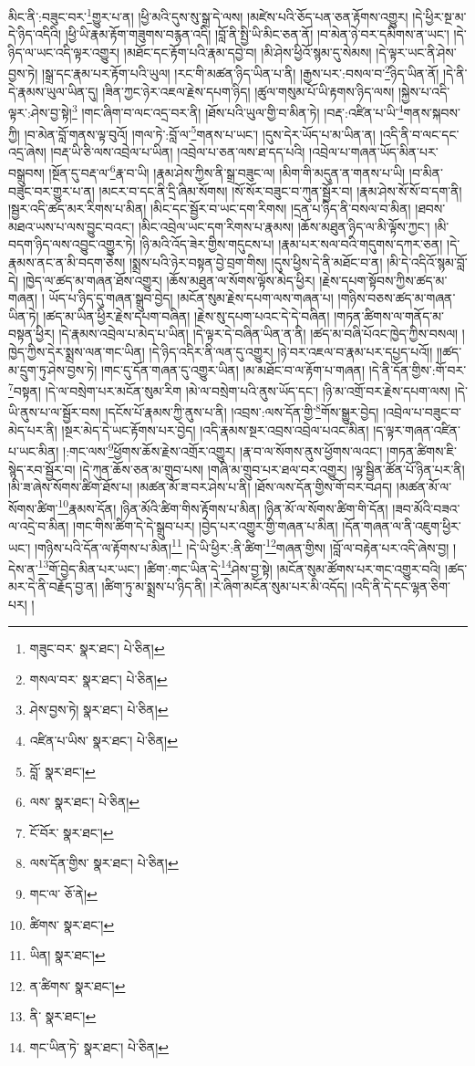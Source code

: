 མིང་ནི་:བཟུང་བར་\footnote{གཟུང་བར་  སྣར་ཐང་།  པེ་ཅིན། }གྱུར་པ་ན། །ཕྱི་མའི་དུས་སུ་སྒྲ་དེ་ལས། །མཛེས་པའི་ཅོད་པན་ཅན་རྟོགས་འགྱུར། །དེ་ཕྱིར་སྔ་མ་དེ་ཉིད་འདིའི། །ཕྱི་ཡི་རྣམ་རྟོག་གཟུགས་བརྙན་འདི། །བློ་ནི་སྤྱི་ཡི་མིང་ཅན་ནོ། །བ་མེན་ཉེ་བར་དམིགས་ན་ཡང་། །དེ་ཉིད་ལ་ཡང་འདི་ལྟར་འགྱུར། །མཐོང་དང་རྟོག་པའི་རྣམ་དབྱེ་བ། །མི་ཤེས་ཕྱིའོ་སྙམ་དུ་སེམས། །དེ་ལྟར་ཡང་ནི་ཤེས་བྱས་ཏེ། །སྒྲ་དང་རྣམ་པར་རྟོག་པའི་ཡུལ། །རང་གི་མཚན་ཉིད་ཡིན་པ་ནི། །རྒྱས་པར་:བསལ་བ་\footnote{གསལ་བར་  སྣར་ཐང་།  པེ་ཅིན། }ཉིད་ཡིན་ནོ། །དེ་ནི་དེ་རྣམས་ཡུལ་ཡིན་དུ། །ཟིན་ཀྱང་ཉེར་འཇལ་རྗེས་དཔག་ཉིད། །ཚུལ་གསུམ་པོ་ཡི་རྟགས་ཉིད་ལས། །སྐྱེས་པ་འདི་ལྟར་:ཤེས་བྱ་སྟེ།\footnote{ཤེས་བྱས་ཏེ།  སྣར་ཐང་།  པེ་ཅིན། } །གང་ཞིག་བ་ལང་འདྲ་བར་ནི། །ཐོས་པའི་ཡུལ་གྱི་བ་མིན་ཏེ། །བརྡ་:འཛིན་པ་ཡི་\footnote{འཛིན་པ་ཡིས་  སྣར་ཐང་།  པེ་ཅིན། }གནས་སྐབས་ཀྱི། །བ་མེན་བློ་གནས་ལྟ་བུའོ། །གལ་ཏེ་:བློ་ལ་\footnote{བློ་  སྣར་ཐང་། }གནས་པ་ཡང་། །དུས་དེར་ཡོད་པ་མ་ཡིན་ན། །འདི་ནི་བ་ལང་དང་འདྲ་ཞེས། །བརྡ་ཡི་ཅི་ལས་འབྲེལ་པ་ཡིན། །འབྲེལ་པ་ཅན་ལས་ཐ་དད་པའི། །འབྲེལ་པ་གཞན་ཡོད་མིན་པར་བསྒྲུབས། །སྔོན་དུ་བརྡ་ལ་\footnote{ལས་  སྣར་ཐང་།  པེ་ཅིན། }རྣ་བ་ཡི། །རྣམ་ཤེས་ཀྱིས་ནི་སྒྲ་བཟུང་ལ། །མིག་གི་མདུན་ན་གནས་པ་ཡི། །བ་མིན་བཟུང་བར་གྱུར་པ་ན། །མངར་བ་དང་ནི་དྲི་ཞིམ་སོགས། །སོ་སོར་བཟུང་བ་ཀུན་སྦྱོར་བ། །རྣམ་ཤེས་སོ་སོ་བ་དག་ནི། །སྦྱར་འདི་ཚད་མར་རིགས་པ་མིན། །མིང་དང་སྦྱོར་བ་ཡང་དག་རིགས། །དྲན་པ་ཉིད་ནི་བསལ་བ་མིན། །ཐབས་མཐའ་ཡས་པ་ལས་བྱུང་བའང་། །མིང་འབྲེལ་ཡང་དག་རིགས་པ་རྣམས། །ཆོས་མཐུན་ཉིད་ལ་མི་ལྟོས་ཀྱང་། །མི་བདག་ཉིད་ལས་འབྱུང་འགྱུར་ཏེ། །ཉི་མའི་འོད་ཟེར་གྱིས་གདུངས་པ། །རྣམ་པར་སལ་བའི་གདུགས་དཀར་ཅན། །དེ་རྣམས་ནང་ན་མི་བདག་ཅེས། །སྨྲས་པའི་ཉེར་བསྟན་བྱེ་བྲག་གིས། །དུས་ཕྱིས་དེ་ནི་མཐོང་བ་ན། །མི་དེ་འདིའོ་སྙམ་བློ་དེ། །ཁྱེད་ལ་ཚད་མ་གཞན་ཐོས་འགྱུར། །ཆོས་མཐུན་ལ་སོགས་ལྟོས་མེད་ཕྱིར། །རྗེས་དཔག་སྟོབས་ཀྱིས་ཚད་མ་གཞན། །
ཡོད་པ་ཉིད་དུ་གཞན་སྒྲུབ་བྱེད། །མངོན་སུམ་རྗེས་དཔག་ལས་གཞན་པ། །གཉིས་བཅས་ཚད་མ་གཞན་ཡིན་ཏེ། །ཚད་མ་ཡིན་ཕྱིར་རྗེས་དཔག་བཞིན། །རྗེས་སུ་དཔག་པའང་དེ་དེ་བཞིན། །གཏན་ཚིགས་ལ་གནོད་མ་བསྟན་ཕྱིར། །དེ་རྣམས་འབྲེལ་པ་མེད་པ་ཡིན། །དེ་ལྟར་དེ་བཞིན་ཡིན་ན་ནི། །ཚད་མ་བཞི་པོའང་ཁྱེད་ཀྱིས་བསལ། །ཁྱེད་ཀྱིས་དེར་སྨྲས་ལན་གང་ཡིན། །དེ་ཉིད་འདིར་ནི་ལན་དུ་འགྱུར། །ཉེ་བར་འཇལ་བ་རྣམ་པར་དཔྱད་པའོ།། །།ཚད་མ་དྲུག་ཏུ་ཤེས་བྱས་ཏེ། །གང་དུ་དོན་གཞན་དུ་འགྱུར་ཡིན། །མ་མཐོང་བ་ལ་རྟོག་པ་གཞན། །དེ་ནི་དོན་གྱིས་:གོ་བར་\footnote{ངོ་བོར་  སྣར་ཐང་། }བསྟན། །དེ་ལ་བསྲེག་པར་མངོན་སུམ་རིག །མེ་ལ་བསྲེག་པའི་ནུས་ཡོད་དང་། །ཉི་མ་འགྲོ་བར་རྗེས་དཔག་ལས། །དེ་ཡི་ནུས་པ་ལ་སྦྱོར་བས། །དངོས་པོ་རྣམས་ཀྱི་ནུས་པ་ནི། །འབྲས་:ལས་དོན་གྱི་\footnote{ལས་དོན་གྱིས་  སྣར་ཐང་།  པེ་ཅིན། }གོས་སྒྱུར་བྱེད། །འབྲེལ་པ་བཟུང་བ་མེད་པར་ནི། །སྔར་མེད་དེ་ཡང་རྟོགས་པར་བྱེད། །འདི་རྣམས་སྔར་འབྲས་འབྲེལ་པའང་མིན། །ད་ལྟར་གཞན་འཛིན་པ་ཡང་མིན། །:གང་ལས་\footnote{གང་ལ་  ཅོ་ནེ། }ཕྱོགས་ཆོས་རྗེས་འགྲོར་འགྱུར། །རྣ་བ་ལ་སོགས་ནུས་ཕྱོགས་ལའང་། །གཏན་ཚིགས་ཇི་སྙེད་རབ་སྦྱོར་བ། །དེ་ཀུན་ཆོས་ཅན་མ་གྲུབ་པས། །གཞི་མ་གྲུབ་པར་ཐལ་བར་འགྱུར། །ལྷ་སྦྱིན་ཚོན་པོ་ཉིན་པར་ནི། །མི་ཟ་ཞེས་སོགས་ཚིག་ཐོས་པ། །མཚན་མོ་ཟ་བར་ཤེས་པ་ནི། །ཐོས་ལས་དོན་གྱིས་གོ་བར་བཤད། །མཚན་མོ་ལ་སོགས་ཚིག་\footnote{ཚིགས་  སྣར་ཐང་། }རྣམས་དོན། །ཉིན་མོའི་ཚིག་གིས་རྟོགས་པ་མིན། །ཉིན་མོ་ལ་སོགས་ཚིག་གི་དོན། །ཟབ་མོའི་བཟའ་ལ་འདྲེ་བ་མིན། །གང་གིས་ཚིག་དེ་དེ་སྒྲུབ་པར། །བྱེད་པར་འགྱུར་གྱི་གཞན་པ་མིན། །དོན་གཞན་ལ་ནི་འཇུག་ཕྱིར་ཡང་། །གཉིས་པའི་དོན་ལ་རྟོགས་པ་མིན།\footnote{ཡིན།  སྣར་ཐང་། } །དེ་ཡི་ཕྱིར་:ནི་ཚིག་\footnote{ན་ཚིགས་  སྣར་ཐང་། }གཞན་གྱིས། །བློ་ལ་བརྟེན་པར་འདི་ཞེས་བྱ། །དེས་ན་\footnote{ནི་  སྣར་ཐང་། }གོ་བྱེད་མིན་པར་ཡང་། །ཚིག་:གང་ཡིན་དེ་\footnote{གང་ཡིན་ཏེ་  སྣར་ཐང་།  པེ་ཅིན། }ཤེས་བྱ་སྟེ། །མངོན་སུམ་ཚོགས་པར་གང་འགྱུར་བའི། །ཚད་མར་དེ་ནི་བརྗོད་བྱ་ན། །ཚིག་ཏུ་མ་སྨྲས་པ་ཉིད་ནི། །རེ་ཞིག་མངོན་སུམ་པར་མི་འདོད། །འདི་ནི་དེ་དང་ལྷན་ཅིག་པར། །
